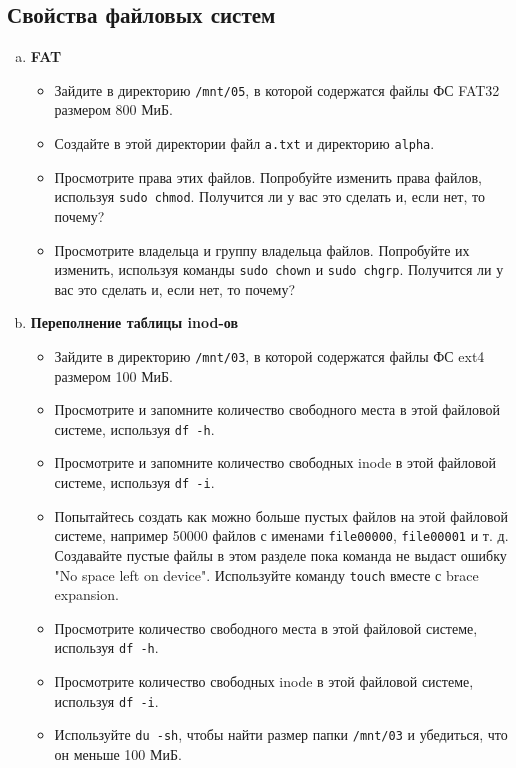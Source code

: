 \documentclass{article}
\begin{document}
\subsection{Свойства файловых систем}
\begin{enumerate}[(a)]
\item \textbf{FAT}
\begin{itemize}
\item Зайдите в директорию \texttt{/mnt/05}, в которой содержатся файлы ФС FAT32 размером 800 МиБ.
\item Создайте в этой директории файл \texttt{a.txt} и директорию \texttt{alpha}.
\item Просмотрите права этих файлов. Попробуйте изменить права файлов, используя \texttt{sudo chmod}. Получится ли у вас это сделать и, если нет, то почему?
\item Просмотрите владельца и группу владельца файлов. Попробуйте их изменить, используя команды \texttt{sudo chown} и \texttt{sudo chgrp}. Получится ли у вас это сделать и, если нет, то почему?
\iffalse
\item Используйте \texttt{stat}, чтобы распечатать метаданные файлов \texttt{a.txt} и \texttt{alpha}.
\fi
\end{itemize}

\item \textbf{Переполнение таблицы inod-ов}
\begin{itemize}
\item Зайдите в директорию \texttt{/mnt/03}, в которой содержатся файлы ФС ext4 размером 100 МиБ.
\item Просмотрите и запомните количество свободного места в этой файловой системе, используя \texttt{df -h}.
\item Просмотрите и запомните количество свободных inode в этой файловой системе, используя \texttt{df -i}.
\item Попытайтесь создать как можно больше пустых файлов на этой файловой системе, например 50000 файлов с именами \texttt{file00000}, \texttt{file00001} и т. д. Создавайте пустые файлы в этом разделе пока команда не выдаст ошибку "No space left on device". Используйте команду \texttt{touch} вместе с brace expansion.
\item Просмотрите количество свободного места в этой файловой системе, используя \texttt{df -h}.
\item Просмотрите количество свободных inode в этой файловой системе, используя \texttt{df -i}.
\item Используйте \texttt{du -sh}, чтобы найти размер папки \texttt{/mnt/03} и убедиться, что он меньше 100 МиБ.
\end{itemize}



\end{enumerate}
\end{document}
